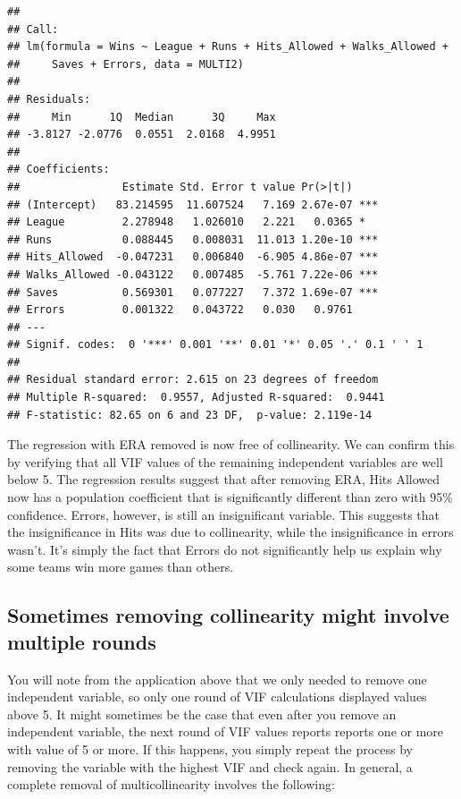 \documentclass[
]{book}
\begin{document}
\begin{verbatim}
## 
## Call:
## lm(formula = Wins ~ League + Runs + Hits_Allowed + Walks_Allowed + 
##     Saves + Errors, data = MULTI2)
## 
## Residuals:
##     Min      1Q  Median      3Q     Max 
## -3.8127 -2.0776  0.0551  2.0168  4.9951 
## 
## Coefficients:
##                Estimate Std. Error t value Pr(>|t|)    
## (Intercept)   83.214595  11.607524   7.169 2.67e-07 ***
## League         2.278948   1.026010   2.221   0.0365 *  
## Runs           0.088445   0.008031  11.013 1.20e-10 ***
## Hits_Allowed  -0.047231   0.006840  -6.905 4.86e-07 ***
## Walks_Allowed -0.043122   0.007485  -5.761 7.22e-06 ***
## Saves          0.569301   0.077227   7.372 1.69e-07 ***
## Errors         0.001322   0.043722   0.030   0.9761    
## ---
## Signif. codes:  0 '***' 0.001 '**' 0.01 '*' 0.05 '.' 0.1 ' ' 1
## 
## Residual standard error: 2.615 on 23 degrees of freedom
## Multiple R-squared:  0.9557, Adjusted R-squared:  0.9441 
## F-statistic: 82.65 on 6 and 23 DF,  p-value: 2.119e-14
\end{verbatim}

The regression with ERA removed is now free of collinearity. We can confirm this by verifying that all VIF values of the remaining independent variables are well below 5. The regression results suggest that after removing ERA, Hits Allowed now has a population coefficient that is significantly different than zero with 95\% confidence. Errors, however, is still an insignificant variable. This suggests that the insignificance in Hits was due to collinearity, while the insignificance in errors wasn't. It's simply the fact that Errors do not significantly help us explain why some teams win more games than others.

\subsection*{Sometimes removing collinearity might involve multiple rounds}\label{sometimes-removing-collinearity-might-involve-multiple-rounds}

You will note from the application above that we only needed to remove one independent variable, so only one round of VIF calculations displayed values above 5. It might sometimes be the case that even after you remove an independent variable, the next round of VIF values reports reports one or more with value of 5 or more. If this happens, you simply repeat the process by removing the variable with the highest VIF and check again. In general, a complete removal of multicollinearity involves the following:
\end{document}
